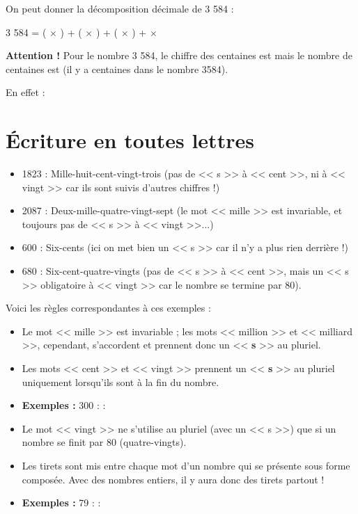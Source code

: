 On peut donner la décomposition décimale de 3 584 :

\begin{examplebox}
	3 584 = (\trous{1.5cm} $\times$ \trous{2cm}) + (\trous{1.5cm} $\times$ \trous{2cm}) + (\trous{1.5cm} $\times$ \trous{2cm}) + \trous{1.5cm} $\times$ \trous{1cm}
\end{examplebox}



\textbf{Attention !} Pour le nombre 3 584, le chiffre des centaines est \trous{2cm} mais le nombre de centaines est \trous{3cm} (il y a \trous{2cm} centaines dans le nombre 3584).

En effet :
\trous{12cm}

\trous{12cm}

\section{Écriture en toutes lettres}

\begin{examplebox}
	\begin{itemize}[label = \textbullet]
		\item 1823 : Mille-huit-cent-vingt-trois (pas de << s >> à << cent >>, ni à << vingt >> car ils sont suivis d'autres chiffres !)
		\item 2087 : Deux-mille-quatre-vingt-sept (le mot << mille >> est invariable, et toujours pas de << s >> à << vingt >>...)
		\item 600 : Six-cents (ici on met bien un << s >> car il n'y a plus rien derrière !)
		\item 680 : Six-cent-quatre-vingts (pas de << s >> à << cent >>, mais un << s >> obligatoire à << vingt >> car le nombre se termine par 80).
	\end{itemize}
\end{examplebox}

Voici les règles correspondantes à ces exemples :

\begin{itemize}
	\item Le mot << mille >> est invariable ; les mots << million >> et << milliard >>, cependant, s'accordent et prennent donc un << \textbf{s} >> au pluriel.
	\item Les mots << cent >> et << vingt >> prennent un << \textbf{s} >> au pluriel uniquement lorsqu'ils sont à la fin du nombre.
	\item \textbf{Exemples :} 300 : \trous{3cm}  : \trous{4cm}
	\item Le mot << vingt >> ne s'utilise au pluriel (avec un << s >>) que si un nombre se finit par 80 (quatre-vingts).
	\item Les tirets sont mis entre chaque mot d'un nombre qui se présente sous forme composée. Avec des nombres entiers, il y aura donc des tirets partout !
	\item \textbf{Exemples :} 79 : \trous{4cm}  : \trous{5cm}
\end{itemize}

